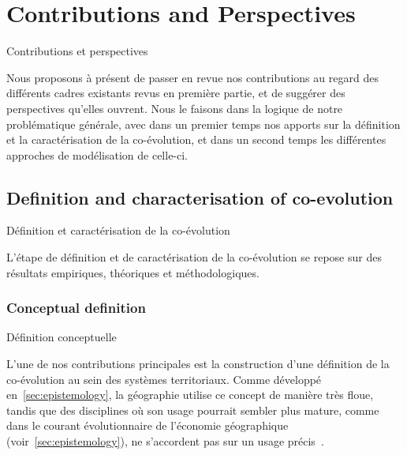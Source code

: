 




\newpage


\section{Contributions and Perspectives}{Contributions et perspectives}

\label{sec:contributions}



Nous proposons à présent de passer en revue nos contributions au regard des différents cadres existants revus en première partie, et de suggérer des perspectives qu'elles ouvrent. Nous le faisons dans la logique de notre problématique générale, avec dans un premier temps nos apports sur la définition et la caractérisation de la co-évolution, et dans un second temps les différentes approches de modélisation de celle-ci.



\subsection{Definition and characterisation of co-evolution}{Définition et caractérisation de la co-évolution}


L'étape de définition et de caractérisation de la co-évolution se repose sur des résultats empiriques, théoriques et méthodologiques.


\subsubsection{Conceptual definition}{Définition conceptuelle}

L'une de nos contributions principales est la construction d'une définition de la co-évolution au sein des systèmes territoriaux. Comme développé en~\ref{sec:epistemology}, la géographie utilise ce concept de manière très floue, tandis que des disciplines où son usage pourrait sembler plus mature, comme dans le courant évolutionnaire de l'économie géographique (voir~\ref{sec:epistemology}), ne s'accordent pas sur un usage précis~\cite{schamp201020}.

